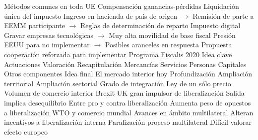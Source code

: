 \documentclass{nuevotema}
\begin{document}
\begin{esquemal}
				\4[] Métodos comunes en toda UE
				\4[] Compensación ganancias-pérdidas
				\4[] Liquidación única del impuesto
				\4[] Ingreso en hacienda de país de origen
				\4[] $\to$ Remisión de parte a EEMM participante
				\4[] $\to$ Reglas de determinación de reparto
				\4 Impuesto digital
				\4[] Gravar empresas tecnológicas
				\4[] $\to$ Muy alta movilidad de base fiscal
				\4[] Presión EEUU para no implementar
				\4[] $\to$ Posibles aranceles en respuesta
				\4 Propuesta cooperación reforzada para implementar
		\2 Programa Fiscalis 2020
			\3 Idea clave
			\3 Actuaciones
			\3 Valoración
	\1[] 
		\2 Recapitulación
			\3 Mercancías
			\3 Servicios
			\3 Personas
			\3 Capitales
			\3 Otros componentes
		\2 Idea final
			\3 El mercado interior hoy
				\4 Profundización
				\4 Ampliación territorial
				\4 Ampliación sectorial
			\3 Grado de integración
				\4 Ley de un sólo precio
				\4 Volumen de comercio interior
			\3 Brexit
				\4 UK gran impulsor de liberalización
				\4 Salida implica desequilibrio
				\4[] Entre pro y contra liberalización
				\4[] Aumenta peso de opuestos a liberalización
			\3 WTO y comercio mundial
				\4 Avances en ámbito multilateral
				\4[] Alteran incentivos a liberalización interna
				\4 Paralización proceso multilateral
				\4[] Difícil valorar efecto europeo
\end{esquemal}
\end{document}
